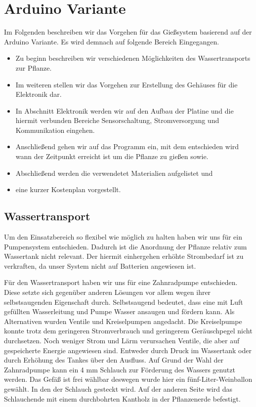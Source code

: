 ﻿\documentclass[]{IEEEtran}
\begin{document}
\section{Arduino Variante}
Im Folgenden beschreiben wir das Vorgehen für das Gießsystem basierend auf der Arduino Variante. Es wird demnach auf folgende Bereich Eingegangen.  
\begin{itemize}
	\item Zu beginn beschreiben wir verschiedenen Möglichkeiten des Wassertransports zur Pflanze.
	\item Im weiteren stellen wir das Vorgehen zur Erstellung des Gehäuses für die Elektronik dar.
	\item In Abschnitt Elektronik werden wir auf den Aufbau der Platine und die hiermit verbunden Bereiche Sensorschaltung, Stromversorgung und Kommunikation eingehen.
	\item Anschließend gehen wir auf das Programm ein, mit dem entschieden wird wann der Zeitpunkt erreicht ist um die Pflanze zu gießen sowie.
	\item Abschließend werden die verwendetet Materialien aufgelistet und
	\item eine kurzer Kostenplan vorgestellt. 
	
\end{itemize}

\subsection{Wassertransport}
Um den Einsatzbereich so flexibel wie möglich zu halten haben wir uns für ein Pumpensystem entschieden. Dadurch ist die Anordnung der Pflanze relativ zum Wassertank nicht relevant. Der hiermit einhergehen erhöhte Strombedarf ist zu verkraften, da unser System nicht auf Batterien angewiesen ist.
	
Für den Wassertransport haben wir uns für eine Zahnradpumpe entschieden.
Diese setzte sich gegenüber anderen Lösungen vor allem wegen ihrer selbstsaugenden Eigenschaft durch.
Selbstsaugend bedeutet, dass eine mit Luft gefüllten Wasserleitung und Pumpe Wasser ansaugen und fördern kann. Als Alternativen wurden Ventile und Kreiselpumpen angedacht.
Die Kreiselpumpe konnte trotz dem geringeren Stromverbrauch und geringerem Geräuschpegel nicht durchsetzen. 
Noch weniger Strom und Lärm verursachen Ventile, die aber auf gespeicherte Energie angewiesen sind.  Entweder durch Druck im Wassertank oder durch Erhöhung des Tankes über den Ausfluss. 
Auf Grund der Wahl der Zahnradpumpe kann ein 4 mm Schlauch zur Förderung des Wassers genutzt werden. Das Gefäß ist frei wählbar deswegen wurde hier ein fünf-Liter-Weinballon gewählt. 
In den der Schlauch gesteckt wird. Auf der anderen Seite wird das Schlauchende mit einem durchbohrten Kantholz in der Pflanzenerde befestigt.
	
\end{document}
